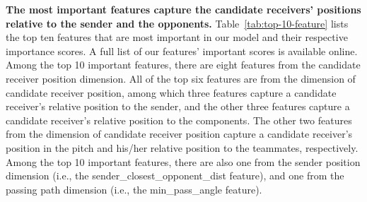 \textbf{The most important features capture the candidate receivers' positions relative to the sender and the opponents.}
Table~\ref{tab:top-10-feature} lists the top ten features that are most important in our model and their respective importance scores.
A full list of our features' important scores is available online\footnotemark[\ref{feature-list}].
Among the top 10 important features, there are eight features from the candidate receiver position dimension. %
All of the top six features are from the dimension of candidate receiver position, among which three features capture a candidate receiver's relative position to the sender, and the other three features capture a candidate receiver's relative position to the components.
The other two features from the dimension of candidate receiver position capture a candidate receiver's position in the pitch and his/her relative position to the teammates, respectively.
Among the top 10 important features, there are also one from the sender position dimension (i.e., the sender\_closest\_opponent\_dist feature), and one from the passing path dimension (i.e., the min\_pass\_angle feature).

